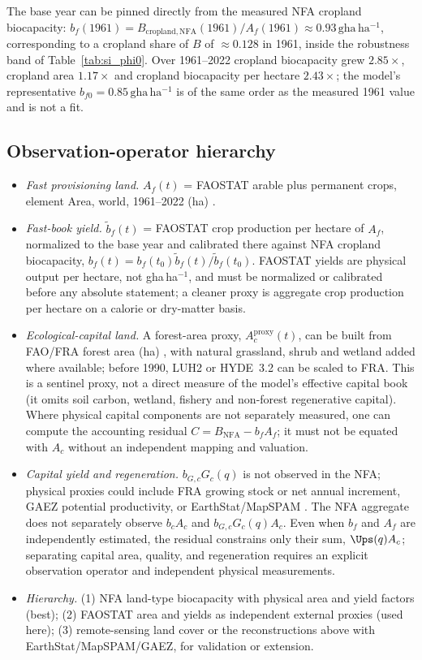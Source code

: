 The base year can be pinned directly from the measured NFA cropland biocapacity: $b_f(1961)=B_{\mathrm{cropland,NFA}}(1961)/A_f(1961)\approx0.93\,\mathrm{gha\,ha^{-1}}$, corresponding to a cropland share of $B$ of $\approx0.128$ in 1961, inside the robustness band of Table~\ref{tab:si_phi0}. Over 1961--2022 cropland biocapacity grew $2.85\times$, cropland area $1.17\times$ and cropland biocapacity per hectare $2.43\times$; the model's representative $b_{f0}=0.85\,\mathrm{gha\,ha^{-1}}$ is of the same order as the measured 1961 value and is not a fit.

\subsection{Observation-operator hierarchy}\label{si:operator}

\begin{itemize}[leftmargin=1.5em]
\item \emph{Fast provisioning land.} $A_f(t)$ = FAOSTAT arable plus permanent crops, element Area, world, 1961--2022 (ha) \citep{FAO2023}.
\item \emph{Fast-book yield.} $\tilde b_f(t)$ = FAOSTAT crop production per hectare of $A_f$, normalized to the base year and calibrated there against NFA cropland biocapacity, $b_f(t)=b_f(t_0)\tilde b_f(t)/\tilde b_f(t_0)$. FAOSTAT yields are physical output per hectare, not gha\,ha$^{-1}$, and must be normalized or calibrated before any absolute statement; a cleaner proxy is aggregate crop production per hectare on a calorie or dry-matter basis.
\item \emph{Ecological-capital land.} A forest-area proxy, $A_c^{\mathrm{proxy}}(t)$, can be built from FAO/FRA forest area (ha) \citep{FAO2020}, with natural grassland, shrub and wetland added where available; before 1990, LUH2 \citep{Hurtt2011} or HYDE~3.2 \citep{KleinGoldewijk2017} can be scaled to FRA. This is a sentinel proxy, not a direct measure of the model's effective capital book (it omits soil carbon, wetland, fishery and non-forest regenerative capital). Where physical capital components are not separately measured, one can compute the accounting residual $C=B_{\mathrm{NFA}}-b_fA_f$; it must not be equated with $A_c$ without an independent mapping and valuation.
\item \emph{Capital yield and regeneration.} $b_{G,c}G_c(q)$ is not observed in the NFA; physical proxies could include FRA growing stock or net annual increment, GAEZ potential productivity, or EarthStat/MapSPAM \citep{Monfreda2008}. The NFA aggregate does not separately observe $b_cA_c$ and $b_{G,c}G_c(q)A_c$. Even when $b_f$ and $A_f$ are independently estimated, the residual constrains only their sum, $\Ups(q)A_c$; separating capital area, quality, and regeneration requires an explicit observation operator and independent physical measurements.
\item \emph{Hierarchy.} (1) NFA land-type biocapacity with physical area and yield factors (best); (2) FAOSTAT area and yields as independent external proxies (used here); (3) remote-sensing land cover \citep{ESA2017,Copernicus2019} or the reconstructions above with EarthStat/MapSPAM/GAEZ, for validation or extension.
\end{itemize}

